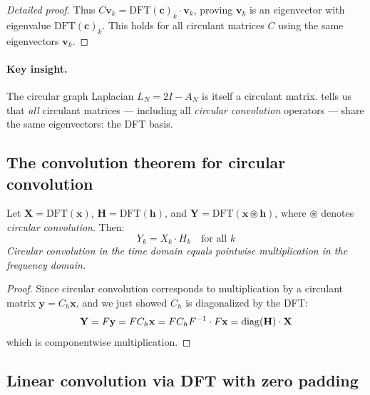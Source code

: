 \begin{notechapter}
\begin{proof}[Detailed proof]
Thus $C\mathbf{v}_k = \text{DFT}(\mathbf{c})_k \cdot \mathbf{v}_k$,
proving $\mathbf{v}_k$ is an eigenvector with eigenvalue
$\text{DFT}(\mathbf{c})_k$. This holds for all circulant matrices $C$
using the same eigenvectors $\mathbf{v}_k$.
\end{proof}

\paragraph{Key insight.} The circular graph Laplacian $L_N = 2I - A_N$ is
itself a circulant matrix. 
tells us that \emph{all} circulant matrices --- including all
\emph{circular convolution} operators --- share the same eigenvectors:
the DFT basis.

\subsection{The convolution theorem for circular convolution}

\begin{theorem}
\label{dft-to-gnn:thm:convolution-circular}
Let $\mathbf{X} = \text{DFT}(\mathbf{x})$,
$\mathbf{H} = \text{DFT}(\mathbf{h})$, and
$\mathbf{Y} = \text{DFT}(\mathbf{x} \circledast \mathbf{h})$, where
$\circledast$ denotes \emph{circular convolution}. Then:
\begin{equation}
Y_k = X_k \cdot H_k \quad \text{for all } k
\end{equation}
\emph{Circular convolution in the time domain equals pointwise
multiplication in the frequency domain.}
\end{theorem}

\begin{proof}
Since circular convolution corresponds to multiplication by a circulant
matrix $\mathbf{y} = C_h \mathbf{x}$, and we just showed $C_h$ is
diagonalized by the DFT:
\begin{equation}
\mathbf{Y} = F\mathbf{y} = F C_h \mathbf{x}
           = F C_h F^{-1} \cdot F\mathbf{x}
           = \operatorname{diag}(\mathbf{H}) \cdot \mathbf{X}
\end{equation}
which is componentwise multiplication.
\end{proof}

\subsection{Linear convolution via DFT with zero padding}


\end{notechapter}
